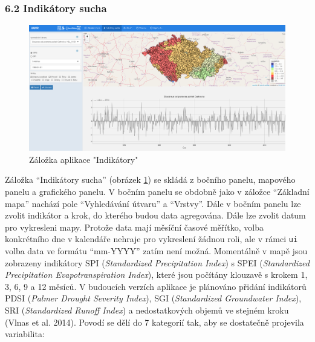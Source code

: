 \documentclass[12pt,]{article}
\begin{document}
\subsubsection{6.2 Indikátory sucha}\label{indikatory-sucha}

\begin{figure}[H]
      \includegraphics[width=\textwidth]{fig/P_indikatory}
      \caption{Záložka aplikace "Indikátory"}
      \label{fig:ch5.4}
\end{figure}

\vspace*{-0.3cm}

\qquad Záložka \enquote{Indikátory sucha} (obrázek \ref{fig:ch5.4}) se
skládá z bočního panelu, mapového panelu a grafického panelu. V bočním
panelu se obdobně jako v záložce \enquote{Základní mapa} nachází pole
\enquote{Vyhledávání útvaru} a \enquote{Vrstvy}. Dále v bočním panelu
lze zvolit indikátor a krok, do kterého budou data agregována. Dále lze
zvolit datum pro vykresleni mapy. Protože data mají měsíční časové
měřítko, volba konkrétního dne v kalendáře nehraje pro vykreslení žádnou
roli, ale v rámci \texttt{ui} volba data ve formátu \enquote{mm-YYYY}
zatím není možná. Momentálně v mapě jsou zobrazeny indikátory SPI
(\emph{Standardized Precipitation Index}) s SPEI (\emph{Standardized
Precipitation Evapotranspiration Index}), které jsou počítány klouzavě s
krokem 1, 3, 6, 9 a 12 měsíců. V budoucích verzích aplikace je plánováno
přidání indikátorů PDSI (\emph{Palmer Drought Severity Index}), SGI
(\emph{Standardized Groundwater Index}), SRI (\emph{Standardized Runoff
Index}) a nedostatkových objemů ve stejném kroku (Vlnas et al. 2014).
Povodí se dělí do 7 kategorií tak, aby se dostatečně projevila
variabilita:
\end{document}

